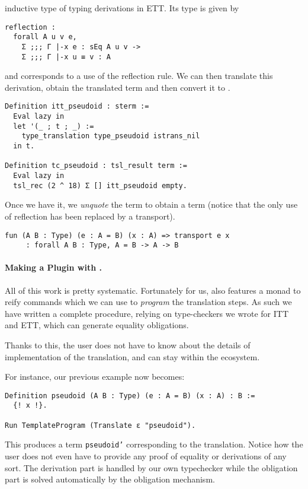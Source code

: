 inductive type of typing derivations in \acrshort{ETT}. Its type is given by
\begin{verbatim}
reflection :
  forall A u v e,
    Σ ;;; Γ |-x e : sEq A u v ->
    Σ ;;; Γ |-x u ≡ v : A
\end{verbatim}
and corresponds to a use of the reflection rule.
We can then translate this derivation, obtain the translated term and then
convert it to \MetaCoq.
%
\begin{verbatim}
Definition itt_pseudoid : sterm :=
  Eval lazy in
  let '(_ ; t ; _) :=
    type_translation type_pseudoid istrans_nil
  in t.

Definition tc_pseudoid : tsl_result term :=
  Eval lazy in
  tsl_rec (2 ^ 18) Σ [] itt_pseudoid empty.
\end{verbatim}
%
Once we have it, we \emph{unquote} the term to obtain a \Coq term
(notice that the only use of reflection has been replaced by a transport).
%
\begin{verbatim}
fun (A B : Type) (e : A = B) (x : A) => transport e x
     : forall A B : Type, A = B -> A -> B
\end{verbatim}

\paragraph{Making a Plugin with \MetaCoq.}
%
All of this work is pretty systematic. Fortunately for us,
\MetaCoq also features a monad to reify \Coq commands which we can
use to \emph{program} the translation steps.
As such we have written a complete procedure, relying on type-checkers we
wrote for \acrshort{ITT} and \acrshort{ETT}, which can generate equality
obligations.

Thanks to this, the user does not have to know about the details of
implementation of the translation, and can stay within the \Coq ecosystem.

For instance, our previous example now becomes:
%
\begin{verbatim}
Definition pseudoid (A B : Type) (e : A = B) (x : A) : B :=
  {! x !}.

Run TemplateProgram (Translate ε "pseudoid").
\end{verbatim}
%
This produces a \Coq term \texttt{pseudoid'} corresponding to the
translation.
Notice how the user does not even have to provide any proof of equality or
derivations of any sort. The derivation part is handled by our own typechecker
while the obligation part is solved automatically by the \Coq obligation mechanism.


